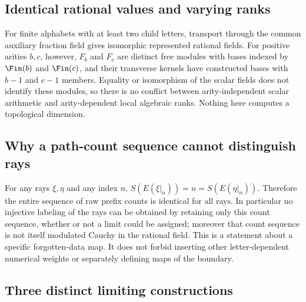 \subsection{Identical rational values and varying ranks}\label{supp:15-1}
\par{}\par\smallskip

For finite alphabets with at least two child letters, transport through the common auxiliary fraction field gives isomorphic represented rational fields. For positive arities $b,c$, however, $F_b$ and $F_c$ are distinct free modules with bases indexed by $\Fin(b)$ and $\Fin(c)$, and their transverse kernels have constructed bases with $b-1$ and $c-1$ members. Equality or isomorphism of the scalar fields does not identify these modules, so there is no conflict between arity-independent scalar arithmetic and arity-dependent local algebraic ranks. Nothing here computes a topological dimension.

\subsection{Why a path-count sequence cannot distinguish rays}\label{supp:15-2}
\par{}\par\smallskip

For any rays $\xi,\eta$ and any index $n$, $S(E(\xi|_n))=n=S(E(\eta|_n))$. Therefore the entire sequence of raw prefix counts is identical for all rays. In particular no injective labeling of the rays can be obtained by retaining only this count sequence, whether or not a limit could be assigned; moreover that count sequence is not itself modulated Cauchy in the rational field. This is a statement about a specific forgotten-data map. It does not forbid inserting other letter-dependent numerical weights or separately defining maps of the boundary.

\subsection{Three distinct limiting constructions}\label{supp:15-3}
\par{}\par\smallskip

